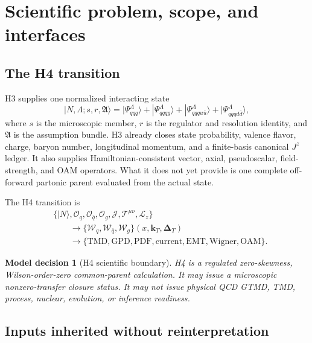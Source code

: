 \documentclass[11pt]{article}
\newtheorem{decision}[definition]{Model decision}
\newcommand{\kT}{\bm{k}_{T}}
\newcommand{\DT}{\bm{\Delta}_{T}}
\newcommand{\TMD}{\ensuremath{\mathrm{TMD}}}
\newcommand{\GPD}{\ensuremath{\mathrm{GPD}}}
\newcommand{\cO}{\mathcal O}
\newcommand{\cT}{\mathcal T}
\newcommand{\cW}{\mathcal W}
\newcommand{\cL}{\mathcal L}
\newcommand{\cJ}{\mathcal J}
\newcommand{\Jz}{J^z}
\begin{document}
\tableofcontents

\section{Scientific problem, scope, and interfaces}
\label{sec:scope}

\subsection{The H4 transition}

H3 supplies one normalized interacting state
\begin{equation}
 |N,\Lambda;s,r,\mathfrak A\rangle
 =
 |\Psi_{qqq}^{\Lambda}\rangle
 +|\Psi_{qqqg}^{\Lambda}\rangle
 +|\Psi_{qqqu\bar u}^{\Lambda}\rangle
 +|\Psi_{qqqd\bar d}^{\Lambda}\rangle,
 \label{eq:h3-state}
\end{equation}
where \(s\) is the microscopic member, \(r\) is the regulator and resolution
identity, and \(\mathfrak A\) is the assumption bundle.  H3 already closes
state probability, valence flavor, charge, baryon number, longitudinal
momentum, and a finite-basis canonical \(\Jz\) ledger.  It also supplies
Hamiltonian-consistent vector, axial, pseudoscalar, field-strength, and OAM
operators.  What it does not yet provide is one complete off-forward partonic
parent evaluated from the actual state.

The H4 transition is
\begin{equation}
\begin{aligned}
 &\bigl\{|N\rangle,\cO_q,\cO_{\bar q},\cO_g,\cJ,\cT^{\mu\nu},\cL_z\bigr\}
 \\
 &\qquad\longrightarrow
 \bigl\{\cW_q,\cW_{\bar q},\cW_g\bigr\}(x,\kT,\DT)
 \\
 &\qquad\longrightarrow
 \bigl\{\TMD,\GPD,\mathrm{PDF},\mathrm{current},\mathrm{EMT},
 \mathrm{Wigner},\mathrm{OAM}\bigr\}.
\end{aligned}
\label{eq:h4-chain}
\end{equation}

\begin{decision}[H4 scientific boundary]
H4 is a regulated zero-skewness, Wilson-order-zero common-parent
calculation.  It may issue a microscopic nonzero-transfer closure status.  It
may not issue physical QCD GTMD, TMD, process, nuclear, evolution, or
inference readiness.
\end{decision}

\subsection{Inputs inherited without reinterpretation}
\end{document}
